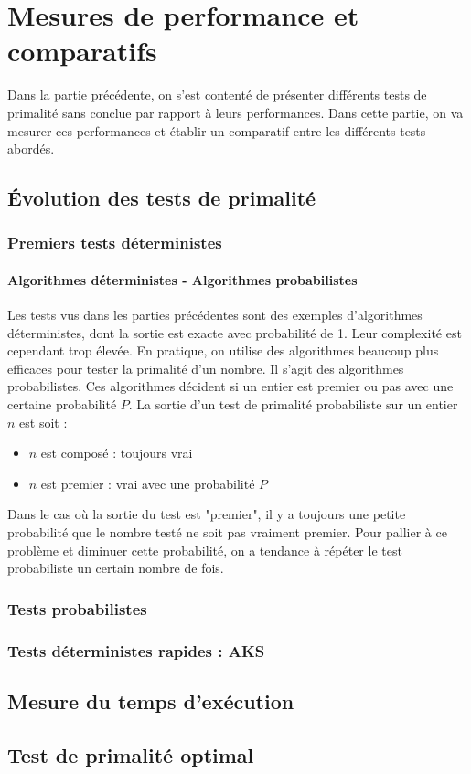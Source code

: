 \section{Mesures de performance et comparatifs}
	Dans la partie précédente, on s'est contenté de présenter différents tests de primalité sans conclue par rapport à leurs performances. Dans cette partie, on va mesurer ces performances et établir un comparatif entre les différents tests abordés.
	
	\subsection{Évolution des tests de primalité}
		\subsubsection{Premiers tests déterministes}
		
			\paragraph{Algorithmes déterministes - Algorithmes probabilistes} Les tests vus dans les parties précédentes sont des exemples d'algorithmes déterministes, dont la sortie est exacte avec probabilité de 1. Leur complexité est cependant trop élevée. 
			En pratique, on utilise des algorithmes beaucoup plus efficaces pour tester la primalité d'un nombre. Il s'agit des algorithmes probabilistes. Ces algorithmes décident si un entier est premier ou pas avec une certaine probabilité $P$. La sortie d'un test de primalité probabiliste sur un entier $n$ est soit :
			\begin{itemize}
				\item $n$ est composé : toujours vrai
				\item $n$ est premier : vrai avec une probabilité $P$
			\end{itemize}
			Dans le cas où la sortie du test est "premier", il y a toujours une petite probabilité que le nombre testé ne soit pas vraiment premier. Pour pallier à ce problème et diminuer cette probabilité, on a tendance à répéter le test probabiliste un certain nombre de fois.
			
		\subsubsection{Tests probabilistes}
		\subsubsection{Tests déterministes rapides : AKS}
		
	
	\subsection{Mesure du temps d'exécution}
	
	\subsection{Test de primalité optimal}
		
